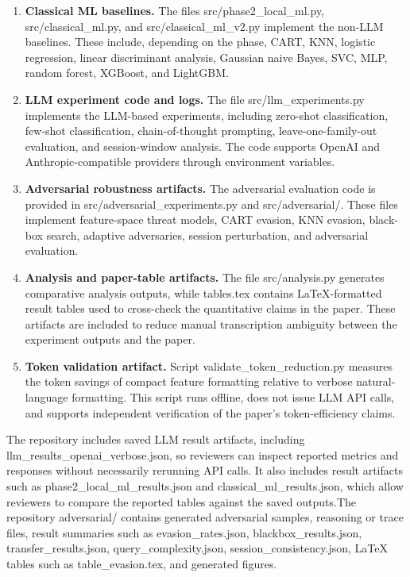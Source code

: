 \documentclass[conference]{IEEEtran}
\begin{document}
\begin{enumerate}
    \item \textbf{Classical ML baselines.}
    The files src/phase2\_local\_ml.py, src/classical\_ml.py, and src/classical\_ml\_v2.py implement the non-LLM baselines. These include, depending on the phase, CART, KNN, logistic regression, linear discriminant analysis, Gaussian naive Bayes, SVC, MLP, random forest, XGBoost, and LightGBM. 

    \item \textbf{LLM experiment code and logs.}
    The file src/llm\_experiments.py implements the LLM-based experiments, including zero-shot classification, few-shot classification, chain-of-thought prompting, leave-one-family-out evaluation, and session-window analysis. The code supports OpenAI and Anthropic-compatible providers through environment variables. 

    \item \textbf{Adversarial robustness artifacts.}
    The adversarial evaluation code is provided in src/adversarial\_experiments.py and src/adversarial/. These files implement feature-space threat models, CART evasion, KNN evasion, black-box search, adaptive adversaries, session perturbation, and adversarial evaluation.  

    \item \textbf{Analysis and paper-table artifacts.}
    The file src/analysis.py generates comparative analysis outputs, while tables.tex contains LaTeX-formatted result tables used to cross-check the quantitative claims in the paper. These artifacts are included to reduce manual transcription ambiguity between the experiment outputs and the paper.

    \item \textbf{Token validation artifact.}
    Script validate\_token\_reduction.py measures the token savings of compact feature formatting relative to verbose natural-language formatting. This script runs offline, does not issue LLM API calls, and supports independent verification of the paper's token-efficiency claims.
\end{enumerate}

The repository includes saved LLM result artifacts, including llm\_results\_openai\_verbose.json, so reviewers can inspect reported metrics and responses without necessarily rerunning API calls. It also includes result artifacts such as phase2\_local\_ml\_results.json and classical\_ml\_results.json, which allow reviewers to compare the reported tables against the saved outputs.The repository adversarial/ contains generated adversarial samples, reasoning or trace files, result summaries such as evasion\_rates.json, blackbox\_results.json, transfer\_results.json, query\_complexity.json, session\_consistency.json, LaTeX tables such as table\_evasion.tex, and generated figures.
\end{document}
